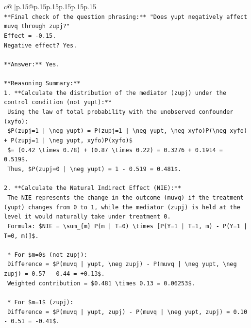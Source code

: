 \documentclass{article}
\begin{document}
{\begin{supertabular}{c@{$\;$}|p{.15\linewidth}@{}p{.15\linewidth}p{.15\linewidth}p{.15\linewidth}p{.15\linewidth}p{.15\linewidth}}
{{{\\ 
\texttt{**Final check of the question phrasing:** "Does yupt negatively affect muvq through zupj?"} \\
\texttt{Effect = {-}0.15.} \\
\texttt{Negative effect? Yes.} \\
\\ 
\texttt{**Answer:** Yes.} \\
\\ 
\texttt{**Reasoning Summary:**} \\
\texttt{1.  **Calculate the distribution of the mediator (zupj) under the control condition (not yupt):**} \\
\texttt{    Using the law of total probability with the unobserved confounder (xyfo):} \\
\texttt{    \$P(zupj=1 | \textbackslash{}neg yupt) = P(zupj=1 | \textbackslash{}neg yupt, \textbackslash{}neg xyfo)P(\textbackslash{}neg xyfo) + P(zupj=1 | \textbackslash{}neg yupt, xyfo)P(xyfo)\$} \\
\texttt{    \$= (0.42 \textbackslash{}times 0.78) + (0.87 \textbackslash{}times 0.22) = 0.3276 + 0.1914 = 0.519\$.} \\
\texttt{    Thus, \$P(zupj=0 | \textbackslash{}neg yupt) = 1 {-} 0.519 = 0.481\$.} \\
\\ 
\texttt{2.  **Calculate the Natural Indirect Effect (NIE):**} \\
\texttt{    The NIE represents the change in the outcome (muvq) if the treatment (yupt) changes from 0 to 1, while the mediator (zupj) is held at the level it would naturally take under treatment 0.} \\
\texttt{    Formula: \$NIE = \textbackslash{}sum\_\{m\} P(m | T=0) \textbackslash{}times {[}P(Y=1 | T=1, m) {-} P(Y=1 | T=0, m){]}\$.} \\
\\ 
\texttt{    *   For \$m=0\$ (not zupj):} \\
\texttt{        Difference = \$P(muvq | yupt, \textbackslash{}neg zupj) {-} P(muvq | \textbackslash{}neg yupt, \textbackslash{}neg zupj) = 0.57 {-} 0.44 = +0.13\$.} \\
\texttt{        Weighted contribution = \$0.481 \textbackslash{}times 0.13 = 0.06253\$.} \\
\\ 
\texttt{    *   For \$m=1\$ (zupj):} \\
\texttt{        Difference = \$P(muvq | yupt, zupj) {-} P(muvq | \textbackslash{}neg yupt, zupj) = 0.10 {-} 0.51 = {-}0.41\$.} \\
}}}
\end{supertabular}}
\end{document}
